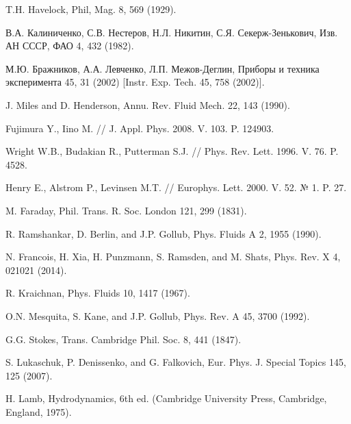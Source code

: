 \begin{thebibliography}{99}
T.H. Havelock, Phil, Mag. 8, 569 (1929).

В.А. Калиниченко, С.В. Нестеров, Н.Л. Никитин, С.Я. Секерж-Зенькович, Изв. АН СССР, ФАО 4, 432 (1982).

М.Ю. Бражников, А.А. Левченко, Л.П. Межов-Деглин, Приборы и техника эксперимента 45, 31 (2002) [Instr. Exp. Tech. 45, 758 (2002)].

J. Miles and D. Henderson, Annu. Rev. Fluid Mech. 22, 143 (1990).

Fujimura Y., Iino M. // J. Appl. Phys. 2008. V. 103. P. 124903.

Wright W.B., Budakian R., Putterman S.J. // Phys. Rev. Lett. 1996. V. 76. P. 4528.

Henry E., Alstrom P., Levinsen M.T. // Europhys. Lett. 2000. V. 52. № 1. P. 27.




M. Faraday, Phil. Trans. R. Soc. London 121, 299 (1831).

R. Ramshankar, D. Berlin, and J.P. Gollub, Phys. Fluids A 2, 1955 (1990).


N. Francois, H. Xia, H. Punzmann, S. Ramsden, and M. Shats, Phys. Rev. X 4, 021021 (2014).

R. Kraichnan, Phys. Fluids 10, 1417 (1967).

O.N. Mesquita, S. Kane, and J.P. Gollub, Phys. Rev. A 45, 3700 (1992).

G.G. Stokes, Trans. Cambridge Phil. Soc. 8, 441 (1847).



S. Lukaschuk, P. Denissenko, and G. Falkovich, Eur. Phys. J. Special Topics 145, 125 (2007).


H. Lamb, Hydrodynamics, 6th ed. (Cambridge University Press, Cambridge, England, 1975).


\end{thebibliography}
